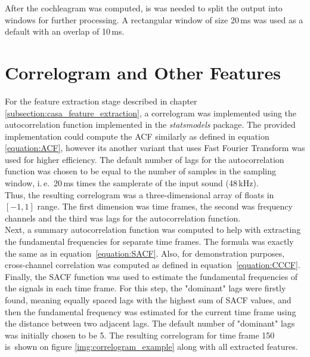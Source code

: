After the cochleagram was computed, is was needed to split the output into windows for further processing. A rectangular window of size 20\,ms was used as a default with an overlap of 10\,ms.

\section{Correlogram and Other Features}

For the feature extraction stage described in chapter \ref{subsection:casa_feature_extraction}, a correlogram was implemented using the autocorrelation function implemented in the \textit{statsmodels} package. The provided implementation could compute the ACF similarly as defined in equation \ref{equation:ACF}, however its another variant that uses Fast Fourier Transform was used for higher efficiency. The default number of lags for the autocorrelation function was chosen to be equal to the number of samples in the sampling window, i.\,e.~20\,ms times the samplerate of the input sound (48\,kHz).\\

Thus, the resulting correlogram was a three-dimensional array of floats in $[-1, 1]$ range. The first dimension was time frames, the second was frequency channels and the third was lags for the autocorrelation function.\\

Next, a summary autocorrelation function was computed to help with extracting the fundamental frequencies for separate time frames. The formula was exactly the same as in equation~\ref{equation:SACF}. Also, for demonstration purposes, cross-channel correlation was computed as defined in equation~\ref{equation:CCCF}.\\

Finally, the SACF function was used to estimate the fundamental frequencies of the signals in each time frame. For this step, the "dominant" lags were firstly found, meaning equally spaced lags with the highest sum of SACF values, and then the fundamental frequency was estimated for the current time frame using the distance between two adjacent lags. The default number of "dominant" lags was initially chosen to be 5. The resulting correlogram for time frame 150 is~shown on figure \ref{img:correlogram_example} along with all extracted features.


